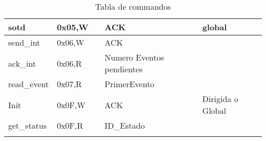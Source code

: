 \begin{table}[h]
{\begin{tabular}{|l|l|l|l|l|}
                  sotd             & 0x05,W         &                    & ACK                       & global                                                                                  \\ \hline{} %
                  send\_int        & 0x06,W         &                    & ACK                       &                                                                                         \\ \hline{} %
                  ack\_int         & 0x06,R         &                    & Numero Eventos pendientes &                                                                                         \\ \hline{} %
                  read\_event      & 0x07,R         &                    & PrimerEvento              &                                                                                         \\ \hline{} %
                  Init             & 0x0F,W         &                    & ACK                       & Dirigida o Global                                                                       \\ \hline{} %
                  get\_status      & 0x0F,R         &                    & ID\_Estado                &                                                                                         \\ \hline{}  %
            \end{tabular}
      }
      \caption{Tabla de commandos}
      \label{tab:Commands}
\end{table}

